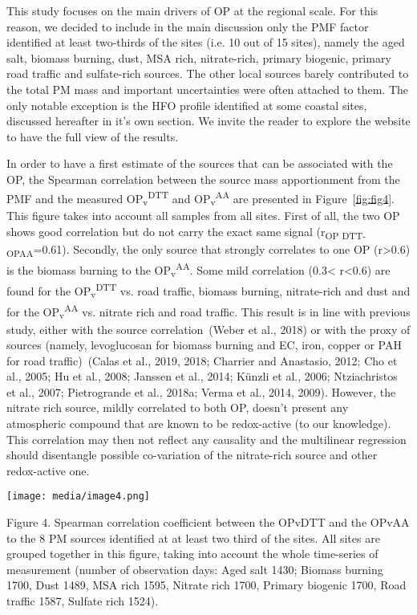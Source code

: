 \documentclass[
]{article}
\begin{document}
This study focuses on the main drivers of OP at the regional scale. For
this reason, we decided to include in the main discussion only the PMF
factor identified at least two-thirds of the sites (i.e. 10 out of 15
sites), namely the aged salt, biomass burning, dust, MSA rich,
nitrate-rich, primary biogenic, primary road traffic and sulfate-rich
sources. The other local sources barely contributed to the total PM mass
and important uncertainties were often attached to them. The only
notable exception is the HFO profile identified at some coastal sites,
discussed hereafter in it's own section. We invite the reader to explore
the website to have the full view of the results.

In order to have a first estimate of the sources that can be associated
with the OP, the Spearman correlation between the source mass
apportionment from the PMF and the measured
OP\textsubscript{v}\textsuperscript{DTT} and
OP\textsubscript{v}\textsuperscript{AA} are presented in
Figure~\protect\hyperlink{fig:fig4}{{[}fig:fig4{]}}. This figure takes
into account all samples from all sites. First of all, the two OP shows
good correlation but do not carry the exact same signal
(r\textsubscript{OP DTT-OPAA}=0.61). Secondly, the only source that
strongly correlates to one OP (r\textgreater0.6) is the biomass burning
to the OP\textsubscript{v}\textsuperscript{AA}. Some mild correlation
(0.3\textless{} r\textless0.6) are found for the
OP\textsubscript{v}\textsuperscript{DTT} vs. road traffic, biomass
burning, nitrate-rich and dust and for the
OP\textsubscript{v}\textsuperscript{AA} vs. nitrate rich and road
traffic. This result is in line with previous study, either with the
source correlation~(Weber et al., 2018) or with the proxy of sources
(namely, levoglucosan for biomass burning and EC, iron, copper or PAH
for road traffic)~(Calas et al., 2019, 2018; Charrier and Anastasio,
2012; Cho et al., 2005; Hu et al., 2008; Janssen et al., 2014; Künzli et
al., 2006; Ntziachristos et al., 2007; Pietrogrande et al., 2018a; Verma
et al., 2014, 2009). However, the nitrate rich source, mildly correlated
to both OP, doesn't present any atmospheric compound that are known to
be redox-active (to our knowledge). This correlation may then not
reflect any causality and the multilinear regression should disentangle
possible co-variation of the nitrate-rich source and other redox-active
one.

\texttt{[image: media/image4.png]}

Figure 4. Spearman correlation coefficient between the OPvDTT and the
OPvAA to the 8 PM sources identified at at least two third of the sites.
All sites are grouped together in this figure, taking into account the
whole time-series of measurement (number of observation days: Aged salt
1430; Biomass burning 1700, Dust 1489, MSA rich 1595, Nitrate rich 1700,
Primary biogenic 1700, Road traffic 1587, Sulfate rich 1524).
\end{document}
